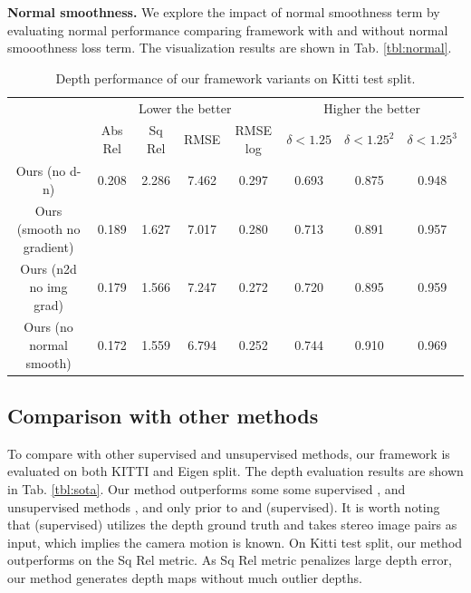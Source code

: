 \textbf{Normal smoothness.} We explore the impact of normal smoothness term by evaluating normal performance comparing framework with and without normal smooothness loss term. The visualization results are shown in Tab. \ref{tbl:normal}.

\begin{table}[]
\centering
\caption{Depth performance of our framework variants on Kitti test split.}
\label{tbl:ablation}
\fontsize{8.5}{9}\selectfont
\bgroup
\def\arraystretch{1.2}
\begin{tabular}{c|c|c|c|c|c|c|c}
\thickhline
\multirow{2}{*}{Methods}  & \multicolumn{4}{c|}{Lower the better} & \multicolumn{3}{c}{Higher the better}                  \\ \cline{2-8} 
                          & Abs Rel  & Sq Rel  & RMSE  & RMSE log & $\delta < 1.25$ & $\delta < 1.25^2$ & $\delta < 1.25^3$ \\ \hline
Ours (no d-n)             & 0.208    & 2.286   & 7.462 & 0.297    & 0.693           & 0.875             & 0.948             \\
Ours (smooth no gradient) & 0.189    & 1.627   & 7.017 & 0.280    & 0.713           & 0.891             & 0.957             \\
Ours (n2d no img grad)    & 0.179    & 1.566   & 7.247 & 0.272    & 0.720           & 0.895             & 0.959             \\
Ours (no normal smooth)   & 0.172    & 1.559   & 6.794 & 0.252    & 0.744           & 0.910             & 0.969             \\ \hline
\end{tabular}
\egroup
\end{table}


\subsection{Comparison with other methods}

To compare with other supervised and unsupervised methods, our framework is evaluated on both KITTI and Eigen split. The depth evaluation results are shown in Tab. \ref{tbl:sota}. Our method outperforms some some supervised \cite{eigen2014depth}, \cite{liu2016learning} and unsupervised methods \cite{zhou2017unsupervised}, \cite{kuznietsov2017semi} and only prior to \cite{godard2016unsupervised} and \cite{kuznietsov2017semi} (supervised). It is worth noting that \cite{kuznietsov2017semi} (supervised) utilizes the depth ground truth and \cite{godard2016unsupervised} takes stereo image pairs as input, which implies the camera motion is known. On Kitti test split, our method outperforms \cite{godard2016unsupervised} on the Sq Rel metric. As Sq Rel metric penalizes large depth error, our method generates depth maps without much outlier depths.

